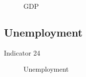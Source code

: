 \documentclass[
  letterpaper,
  oneside,
  open=any]{scrbook}
\begin{document}
\begin{figure}


\caption{\label{fig-GDP}GDP}

\end{figure}%

\subsection{Unemployment}\label{unemployment}

Indicator 24

\begin{figure}


\caption{\label{fig-unemp}Unemployment}

\end{figure}%
\end{document}
